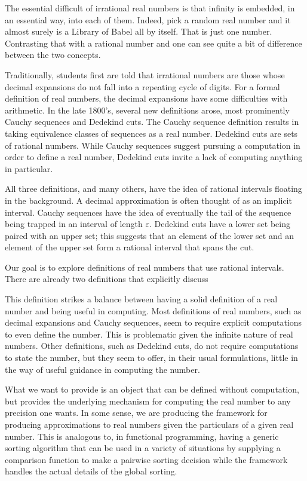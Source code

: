 \documentclass[12pt]{article}
\begin{document}
The essential difficult of irrational real numbers is that infinity is embedded, in an essential way, into each of them. Indeed, pick a random real number and it almost surely is a Library of Babel all by itself. That is just one number. Contrasting that with a rational number and one can see quite a bit of difference between the two concepts. 

Traditionally, students first are told that irrational numbers are those whose decimal expansions do not fall into a repeating cycle of digits. For a formal definition of real numbers, the decimal expansions have some difficulties with arithmetic. In the late 1800's, several new definitions arose, most prominently Cauchy sequences and Dedekind cuts. The Cauchy sequence definition results in taking equivalence classes of sequences as a real number. Dedekind cuts are sets of rational numbers. While Cauchy sequences suggest pursuing a computation in order to define a real number, Dedekind cuts invite a lack of computing anything in particular. 

All three definitions, and many others, have the idea of rational intervals floating in the background. A decimal approximation is often thought of as an implicit interval. Cauchy sequences have the idea of eventually the tail of the sequence being trapped in an interval of length $\varepsilon$. Dedekind cuts have a lower set being paired with an upper set; this suggests that an element of the lower set and an element of the upper set form a rational interval that spans the cut. 

Our goal is to explore definitions of real numbers that use rational intervals. There are already two definitions that explicitly discuss 


This definition strikes a balance between having a solid definition of a real number and being useful in computing. Most definitions of real numbers, such as decimal expansions and Cauchy sequences, seem to require explicit computations to even define the number. This is problematic given the infinite nature of real numbers. Other definitions, such as Dedekind cuts, do not require computations to state the number, but they seem to offer, in their usual formulations, little in the way of useful guidance in computing the number. 

What we want to provide is an object that can be defined without computation, but provides the underlying mechanism for computing the real number to any precision one wants. In some sense, we are producing the framework for producing approximations to real numbers given the particulars of a given real number.  This is analogous to, in functional programming,  having a generic sorting algorithm that can be used in a variety of situations by supplying a comparison function to make a pairwise sorting decision while the framework handles the actual details of the global sorting.
\end{document}
